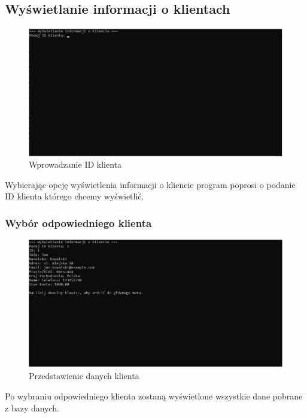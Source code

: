 \subsection{Wyświetlanie informacji o klientach}
\begin{figure}[h]
    \centering
    \includegraphics[width=\textwidth]{WysInf.png}
      \caption{Wprowadzanie ID klienta}
    \label{fig:example}
\end{figure}

Wybierając opcję wyświetlenia informacji o kliencie program poprosi o podanie ID klienta którego chcemy wyświetlić.

\subsubsection{Wybór odpowiedniego klienta}
\begin{figure}[h]
    \centering
    \includegraphics[width=\textwidth]{WysInf1.png}
      \caption{Przedstawienie danych klienta}
    \label{fig:example}
\end{figure}

Po wybraniu odpowiedniego klienta zostaną wyświetlone wszystkie dane pobrane z bazy danych. 

